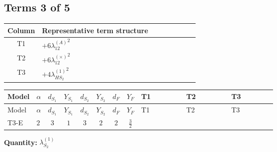 \documentclass[8pt]{article}
\begin{document}
\begin{landscape}
\subsection*{Terms 3 of 5}
\begin{center}
\begin{tabular}{@{}c >{\raggedright\arraybackslash}p{0.82\linewidth}@{}}
\toprule
Column & Representative term structure \\
\midrule
T1 & \(\displaystyle +6 {\lambda_{12}^{(A)}}^2\) \\
\midrule
T2 & \(\displaystyle +6 {\lambda_{12}^{(\times)}}^2\) \\
\midrule
T3 & \(\displaystyle +4 {\lambda_{HS_2}^{(1)}}^2\) \\
\midrule
\bottomrule
\end{tabular}
\end{center}
\smallskip
\tiny
\begin{longtable}{@{}llcccccc >{\raggedright\arraybackslash}p{0.21\linewidth} >{\raggedright\arraybackslash}p{0.21\linewidth} >{\raggedright\arraybackslash}p{0.21\linewidth}@{}}
\toprule
Model & $\alpha$ & $d_{S_1}$ & $Y_{S_1}$ & $d_{S_2}$ & $Y_{S_2}$ & $d_F$ & $Y_F$ & T1 & T2 & T3 \\
\midrule
\endfirsthead
\toprule
Model & $\alpha$ & $d_{S_1}$ & $Y_{S_1}$ & $d_{S_2}$ & $Y_{S_2}$ & $d_F$ & $Y_F$ & T1 & T2 & T3 \\
\midrule
\endhead
T3-E & $2$ & $3$ & $1$ & $3$ & $2$ & $2$ & $\frac{3}{2}$ & \scriptsize\adjustbox{max width=\linewidth}{$\begin{gathered} +6 {\lambda_{12}^{(A)}}^2\end{gathered}$} & \scriptsize\adjustbox{max width=\linewidth}{$\begin{gathered} +6 {\lambda_{12}^{(\times)}}^2\end{gathered}$} & \scriptsize\adjustbox{max width=\linewidth}{$\begin{gathered} +4 {\lambda_{HS_2}^{(1)}}^2\end{gathered}$} \\
\midrule
\bottomrule
\end{longtable}
\clearpage
\noindent\textbf{Quantity: }$\lambda_{S_2}^{(1)}$\par\smallskip

\end{landscape}
\end{document}
